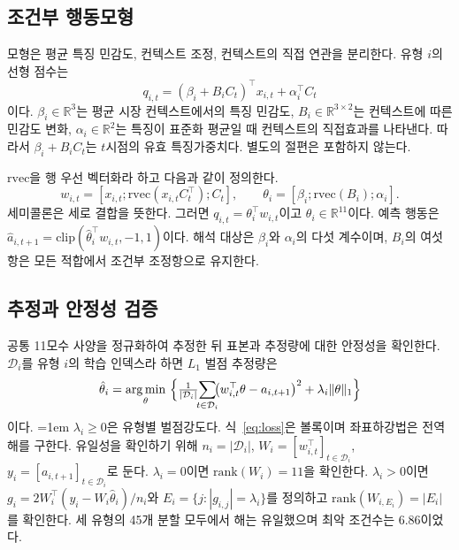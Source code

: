 \subsection{조건부 행동모형}
\label{sec:model}

모형은 평균 특징 민감도, 컨텍스트 조정, 컨텍스트의 직접 연관을 분리한다. 유형 $i$의
선형 점수는
\begin{equation}
q_{i,t}=(\beta_i+B_iC_t)^\top x_{i,t}+\alpha_i^\top C_t
\label{eq:model}
\end{equation}
이다. $\beta_i\in\mathbb R^3$는 평균 시장 컨텍스트에서의 특징 민감도,
$B_i\in\mathbb R^{3\times2}$는 컨텍스트에 따른 민감도 변화,
$\alpha_i\in\mathbb R^2$는 특징이 표준화 평균일 때 컨텍스트의 직접효과를 나타낸다.
따라서 $\beta_i+B_iC_t$는 $t$시점의 유효 특징가중치다. 별도의 절편은 포함하지 않는다.

$\mathrm{rvec}$을 행 우선 벡터화라 하고 다음과 같이 정의한다.
{\small
\[
w_{i,t}=[x_{i,t};\mathrm{rvec}(x_{i,t}C_t^\top);C_t],\qquad
\theta_i=[\beta_i;\mathrm{rvec}(B_i);\alpha_i].
\]
}
세미콜론은 세로 결합을 뜻한다. 그러면 $q_{i,t}=\theta_i^\top w_{i,t}$이고
$\theta_i\in\mathbb R^{11}$이다. 예측 행동은
$\hat a_{i,t+1}=\mathrm{clip}(\hat\theta_i^\top w_{i,t},-1,1)$이다. 해석 대상은
$\beta_i$와 $\alpha_i$의 다섯 계수이며, $B_i$의 여섯 항은 모든 적합에서 조건부
조정항으로 유지한다.

\subsection{추정과 안정성 검증}
\label{sec:protocol}

공통 11모수 사양을 정규화하여 추정한 뒤 표본과 추정량에 대한 안정성을 확인한다.
$\mathcal D_i$를 유형 $i$의 학습 인덱스라 하면 $L_1$ 벌점 추정량은
\begin{equation}
\hat\theta_i=\operatorname*{arg\,min}_{\theta}\ \Bigl\{\tfrac{1}{|\mathcal{D}_i|}
\!\!\sum_{t\in\mathcal{D}_i}\!\!\bigl(w_{i,t}^{\top}\theta-a_{i,t+1}\bigr)^{2}
+\lambda_i\lVert\theta\rVert_1\Bigr\}
\label{eq:loss}
\end{equation}
이다.
{\emergencystretch=1em
$\lambda_i\ge0$은 유형별 벌점강도다. 식~\eqref{eq:loss}은 볼록이며 좌표하강법은
전역해를 구한다. 유일성을 확인하기 위해 $n_i=|\mathcal D_i|$,
$W_i=[w_{i,t}^{\top}]_{t\in\mathcal D_i}$,
$y_i=[a_{i,t+1}]_{t\in\mathcal D_i}$로 둔다. $\lambda_i=0$이면
$\mathrm{rank}(W_i)=11$을 확인한다. $\lambda_i>0$이면
$g_i=2W_i^\top(y_i-W_i\hat\theta_i)/n_i$와
$E_i=\{j:|g_{i,j}|=\lambda_i\}$를 정의하고
$\mathrm{rank}(W_{i,E_i})=|E_i|$를 확인한다. 세 유형의 45개 분할 모두에서 해는
유일했으며 최악 조건수는 6.86이었다.
}

